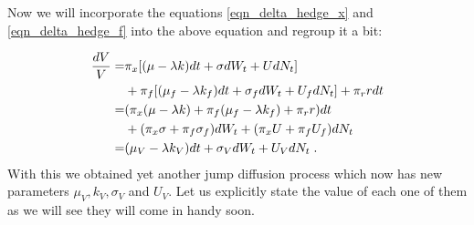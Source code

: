 \documentclass[times, utf8, diplomski]{fer}
\begin{document}
\noindent Now we will incorporate the equations \ref{eqn_delta_hedge_x} and \ref{eqn_delta_hedge_f} into the above equation and regroup it a bit:

\begin{align*}
	\frac{dV}{V} =& \pi_x [(\mu - \lambda k)dt + \sigma dW_t + UdN_t] \\&+\pi_f [(\mu_f - \lambda k_f)dt + \sigma_f dW_t + U_fdN_t] +\pi_r r dt \\
				 =& (\pi_x(\mu-\lambda k) + \pi_f (\mu_f - \lambda k_f) + \pi_r r) dt \\&+ (\pi_x\sigma + \pi_f\sigma_f)dW_t + (\pi_x U + \pi_f U_f)dN_t \\
				 =& (\mu_V - \lambda k_V)dt + \sigma_V dW_t + U_V dN_t \hspace{0.1cm}.
\end{align*} 
With this we obtained yet another jump diffusion process which now has new parameters $\mu_V, k_V, \sigma_V$ and $U_V$. Let us explicitly state the value of each one of them as we will see they will come in handy soon.
\end{document}
